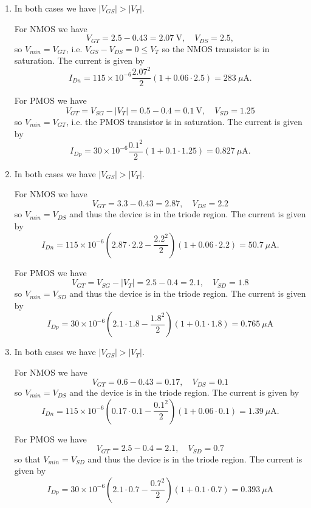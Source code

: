 \documentclass{article}
\begin{document}
\begin{enumerate}[label=(\alph*)]
  \item{
    In both cases we have $|V_{GS}| > |V_T|$.

    For NMOS we have
    $$
    V_{GT} = 2.5 - 0.43 = 2.07 ~\mathrm{V}, \quad
    V_{DS} = 2.5,
    $$
    so $V_{min} = V_{GT}$, i.e. $V_{GS} - V_{DS} = 0 \leq V_T$ so the
    NMOS transistor is in saturation. The current is given by
    $$
    I_{Dn} = 115 \times 10^{-6} \frac{2.07^2}{2}(1 + 0.06 \cdot 2.5)
          = 283 ~\mu\mathrm{A}.
    $$

    For PMOS we have
    $$
    V_{GT} = V_{SG} - |V_T| = 0.5 - 0.4 = 0.1 ~\mathrm{V}, \quad
    V_{SD} = 1.25
    $$
    so $V_{min} = V_{GT}$, i.e. the PMOS transistor is in
    saturation. The current is given by
    $$
    I_{Dp} = 30 \times 10^{-6} \frac{0.1^2}{2}(1 + 0.1 \cdot 1.25)
          = 0.827 ~\mu\mathrm{A}.
    $$
  }
  \item{
    In both cases we have $|V_{GS}| > |V_T|$.

    For NMOS we have
    $$
    V_{GT} = 3.3 - 0.43 = 2.87, \quad
    V_{DS} = 2.2
    $$
    so $V_{min} = V_{DS}$ and thus the device is in the triode
    region. The current is given by
    $$
    I_{Dn} = 115 \times 10^{-6}
            (2.87 \cdot 2.2 - \frac{2.2^2}{2})
            (1 + 0.06 \cdot 2.2)
          = 50.7 ~\mu\mathrm{A}.
    $$

    For PMOS we have
    $$
    V_{GT} = V_{SG} - |V_T| = 2.5 - 0.4 = 2.1, \quad
    V_{SD} = 1.8
    $$
    so $V_{min} = V_{SD}$ and thus the device is in the triode region.
    The current is given by
    $$
    I_{Dp} = 30 \times 10^{-6}
            (2.1 \cdot 1.8 - \frac{1.8^2}{2})
            (1 + 0.1 \cdot 1.8)
          = 0.765 ~\mu\mathrm{A}
    $$
  }
  \item{
    In both cases we have $|V_{GS}| > |V_T|$.

    For NMOS we have
    $$
    V_{GT} = 0.6 - 0.43 = 0.17, \quad
    V_{DS} = 0.1
    $$
    so $V_{min} = V_{DS}$ and the device is in the triode region.
    The current is given by
    $$
    I_{Dn} = 115 \times 10^{-6}
            (0.17 \cdot 0.1 - \frac{0.1^2}{2})
            (1 + 0.06 \cdot 0.1)
          = 1.39 ~\mu\mathrm{A}.
    $$

    For PMOS we have
    $$
    V_{GT} = 2.5 - 0.4 = 2.1, \quad
    V_{SD} = 0.7
    $$
    so that $V_{min} = V_{SD}$ and thus the device is in the triode
    region. The current is given by
    $$
    I_{Dp} = 30 \times 10^{-6}
            (2.1 \cdot 0.7 - \frac{0.7^2}{2})
            (1 + 0.1 \cdot 0.7)
          = 0.393 ~\mu\mathrm{A}
    $$
  }
\end{enumerate}
\end{document}
